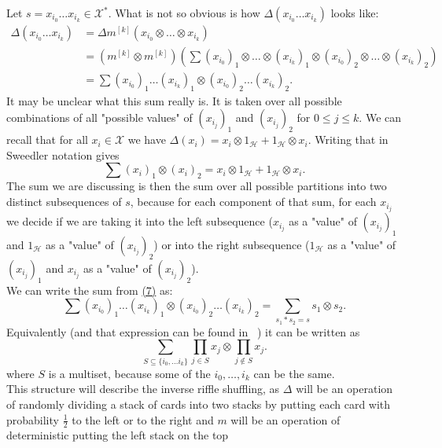 \documentclass[a4paper, 12pt]{article}
\begin{document}
\noindent Let $s = x_{i_0}\dots x_{i_k} \in \mathcal{X}^*$. What is not so obvious is
how $\Delta(x_{i_0}\dots x_{i_k})$ looks like:
\begin{align}
\Delta(x_{i_0}\dots x_{i_k}) &= \Delta m^{[k]}(x_{i_0} \otimes \dots \otimes x_{i_k}) \\
&= (m^{[k]} \otimes m^{[k]}) \left(\sum (x_{i_0})_1 \otimes \dots \otimes (x_{i_k})_1 \otimes
(x_{i_0})_2 \otimes \dots \otimes (x_{i_k})_2\right) \\
&= \label{siedem}\sum (x_{i_0})_1 \dots (x_{i_k})_1 \otimes
(x_{i_0})_2 \dots (x_{i_k})_2.
\end{align}
It may be unclear what this sum really is. It is taken over all possible combinations of all "possible
values" of $(x_{i_j})_1$ and $(x_{i_j})_2$ for $ 0 \leq j \leq k$. We can recall that for all
$x_i \in \mathcal{X}$ we
have $\Delta(x_i) = x_i \otimes 1_\mathcal{H} + 1_\mathcal{H} \otimes x_i$. Writing that in Sweedler
notation gives
\begin{equation*}
\sum(x_i)_1 \otimes (x_i)_2 = x_i \otimes 1_\mathcal{H} + 1_\mathcal{H} \otimes x_i.
\end{equation*}
The sum we are discussing is then the sum over all possible partitions into two distinct subsequences of $s$,
because for each component of that sum, for each $x_{i_j}$ we decide if we are taking it into the left
subsequence ($x_{i_j}$ as a "value" of $(x_{i_j})_1$ and $1_\mathcal{H}$ as a "value" of $(x_{i_j})_2$) or
into the right subsequence ($1_\mathcal{H}$ as a "value" of $(x_{i_j})_1$ and $x_{i_j}$ as a "value" of
$(x_{i_j})_2$). \\
We can write the sum from \hyperref[siedem]{(7)} as:
\begin{equation*}
\sum (x_{i_0})_1 \dots (x_{i_k})_1 \otimes (x_{i_0})_2 \dots (x_{i_k})_2 =
\sum_{s_1*s_2=s} s_1 \otimes s_2.
\end{equation*}
Equivalently (and that expression can be found in ~\cite{Diaconis2014}) it can be written as
\begin{equation*}
\sum_{S \subseteq \{ i_0, \dots i_k \} } \prod_{j \in S} x_j \otimes \prod_{j \notin S} x_j.
\end{equation*}
where $S$ is a multiset, because some of the $i_0, \dots, i_k$ can be the same. \\
\indent This structure will describe the inverse riffle shuffling, as $\Delta$ will be an operation of
randomly dividing a stack of cards into two stacks by putting each card with probability $\frac{1}{2}$ to
the left or to the right and $m$ will be an operation of deterministic putting the left stack on the top
\end{document}
